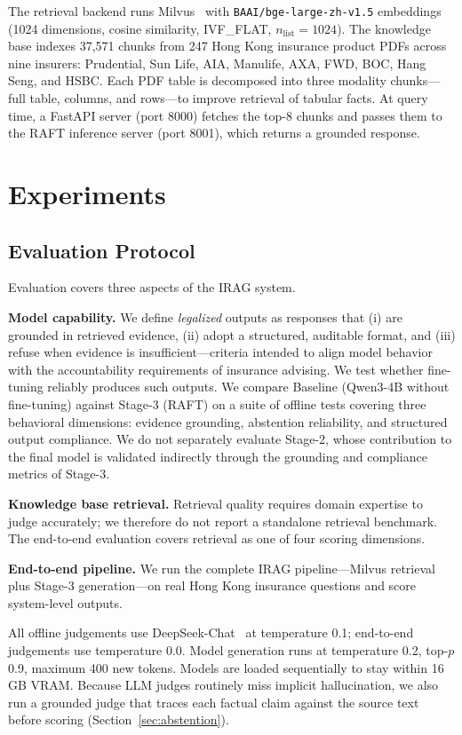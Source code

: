 \documentclass[10pt,conference]{IEEEtran}
\begin{document}
The retrieval backend runs Milvus~\cite{milvus} with \texttt{BAAI/bge-large-zh-v1.5}
embeddings~\cite{bge} (1024 dimensions, cosine similarity, IVF\_FLAT, $n_\text{list}{=}1024$).
The knowledge base indexes 37,571 chunks from 247 Hong Kong insurance product
PDFs across nine insurers: Prudential, Sun Life, AIA, Manulife, AXA, FWD, BOC,
Hang Seng, and HSBC.
Each PDF table is decomposed into three modality chunks---full table, columns,
and rows---to improve retrieval of tabular facts.
At query time, a FastAPI server (port 8000) fetches the top-8 chunks and passes
them to the RAFT inference server (port 8001), which returns a grounded
response.

\section{Experiments}\label{sec:exp}
\subsection{Evaluation Protocol}

Evaluation covers three aspects of the IRAG system.

\noindent\textbf{Model capability.}
We define \emph{legalized} outputs as responses that (i) are grounded in
retrieved evidence, (ii) adopt a structured, auditable format, and
(iii) refuse when evidence is insufficient---criteria intended to align model
behavior with the accountability requirements of insurance advising.
We test whether fine-tuning reliably produces such outputs.
We compare Baseline (Qwen3-4B without fine-tuning) against Stage-3 (RAFT) on
a suite of offline tests covering three behavioral dimensions:
evidence grounding, abstention reliability, and structured output compliance.
We do not separately evaluate Stage-2, whose contribution to the final model
is validated indirectly through the grounding and compliance metrics of Stage-3.

\noindent\textbf{Knowledge base retrieval.}
Retrieval quality requires domain expertise to judge accurately; we therefore
do not report a standalone retrieval benchmark.
The end-to-end evaluation covers retrieval as one of four scoring dimensions.

\noindent\textbf{End-to-end pipeline.}
We run the complete IRAG pipeline---Milvus retrieval plus Stage-3
generation---on real Hong Kong insurance questions and score system-level outputs.

All offline judgements use DeepSeek-Chat~\cite{deepseek} at temperature 0.1;
end-to-end judgements use temperature 0.0.
Model generation runs at temperature 0.2, top-$p$ 0.9, maximum 400 new tokens.
Models are loaded sequentially to stay within 16\,GB VRAM.
Because LLM judges routinely miss implicit hallucination, we also run a grounded
judge that traces each factual claim against the source text before scoring
(Section~\ref{sec:abstention}).
\end{document}

